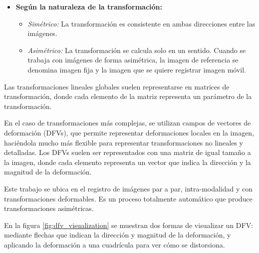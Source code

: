 \begin{itemize}
    \item \textbf{Según la naturaleza de la transformación:}
    \begin{itemize}
        \item \textit{Simétrico:} La transformación es consistente en ambas direcciones entre las imágenes.
        \item \textit{Asimétrico:} La transformación se calcula solo en un sentido. Cuando se trabaja con imágenes de forma asimétrica, la imagen de referencia se denomina imagen fija y la imagen que se quiere registrar imagen móvil.
    \end{itemize}

\end{itemize}

Las transformaciones lineales globales suelen representarse en matrices de transformación, donde cada elemento de la matriz representa un parámetro de la transformación.

En el caso de transformaciones más complejas, se utilizan campos de vectores de deformación (\gls{DFV}s), que permite representar deformaciones locales en la imagen, haciéndola mucho más flexible para representar transformaciones no lineales y detalladas.
Los DFVs suelen ser representados con una matriz de igual tamaño a la imagen, donde cada elemento representa un vector que indica la dirección y la magnitud de la deformación.

Este trabajo se ubica en el registro de imágenes par a par, intra-modalidad y con transformaciones deformables. Es un proceso totalmente automático que produce transformaciones asimétricas.

En la figura \ref{fig:dfv_visualization} se muestran dos formas de visualizar un DFV: mediante flechas que indican la dirección y magnitud de la deformación, y aplicando la deformación a una cuadrícula para ver cómo se distorsiona.

